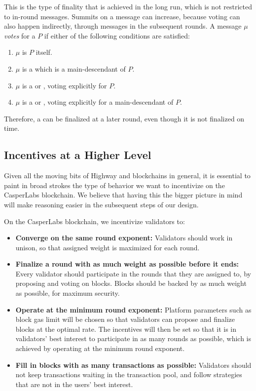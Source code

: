 This is the type of finality that is achieved in the long run, which is not restricted to in-round messages. Summits on a message can increase, because voting can also happen indirectly, through messages in the subsequent rounds. A message $\mu$ \emph{votes} for a \PROP $P$ if either of the following conditions are satisfied:

\begin{enumerate}
\def\labelenumi{\arabic{enumi}.}
\item $\mu$ is $P$ itself.
\item $\mu$ is a \PROP which is a main-descendant of $P$.
\item $\mu$ is a \CONF or \WIT, voting explicitly for $P$.
\item $\mu$ is a \CONF or \WIT, voting explicitly for a main-descendant of $P$.
\end{enumerate}

Therefore, a \PROP can be finalized at a later round, even though it is not finalized on time.

\subsection{Incentives at a Higher Level}

Given all the moving bits of Highway and blockchains in general, it is essential to paint in broad strokes the type of behavior we want to incentivize on the CasperLabs blockchain. We believe that having this the bigger picture in mind will make reasoning easier in the subsequent steps of our design.

On the CasperLabs blockchain, we incentivize validators to:

\begin{itemize}
\item \textbf{Converge on the same round exponent:} Validators should work in unison, so that assigned weight is maximized for each round.
\item \textbf{Finalize a round with as much weight as possible before it ends:} Every validator should participate in the rounds that they are assigned to, by proposing and voting on blocks. Blocks should be backed by as much weight as possible, for maximum security.
\item \textbf{Operate at the minimum round exponent:} Platform parameters such as block gas limit will be chosen so that validators can propose and finalize blocks at the optimal rate. The incentives will then be set so that it is in validators' best interest to participate in as many rounds as possible, which is achieved by operating at the minimum round exponent.
\item \textbf{Fill in blocks with as many transactions as possible:} Validators should not keep transactions waiting in the transaction pool, and follow strategies that are not in the users' best interest.
\end{itemize}

